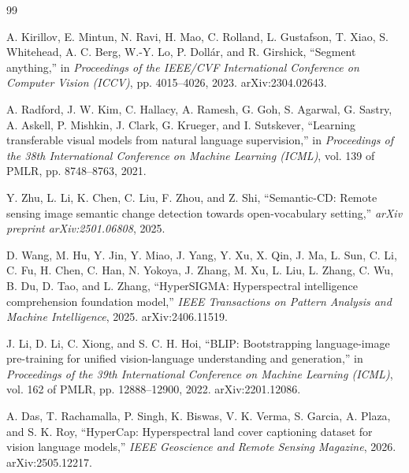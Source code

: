 \documentclass[12pt]{article}
\begin{document}
\begin{thebibliography}{99}

 A. Kirillov, E. Mintun, N. Ravi, H. Mao, C. Rolland, L. Gustafson, T. Xiao, S. Whitehead, A. C. Berg, W.-Y. Lo, P. Dollár, and R. Girshick, ``Segment anything,'' in \textit{Proceedings of the IEEE/CVF International Conference on Computer Vision (ICCV)}, pp. 4015--4026, 2023. arXiv:2304.02643.

 A. Radford, J. W. Kim, C. Hallacy, A. Ramesh, G. Goh, S. Agarwal, G. Sastry, A. Askell, P. Mishkin, J. Clark, G. Krueger, and I. Sutskever, ``Learning transferable visual models from natural language supervision,'' in \textit{Proceedings of the 38th International Conference on Machine Learning (ICML)}, vol. 139 of PMLR, pp. 8748--8763, 2021.

 Y. Zhu, L. Li, K. Chen, C. Liu, F. Zhou, and Z. Shi, ``Semantic-CD: Remote sensing image semantic change detection towards open-vocabulary setting,'' \textit{arXiv preprint arXiv:2501.06808}, 2025.

 D. Wang, M. Hu, Y. Jin, Y. Miao, J. Yang, Y. Xu, X. Qin, J. Ma, L. Sun, C. Li, C. Fu, H. Chen, C. Han, N. Yokoya, J. Zhang, M. Xu, L. Liu, L. Zhang, C. Wu, B. Du, D. Tao, and L. Zhang, ``HyperSIGMA: Hyperspectral intelligence comprehension foundation model,'' \textit{IEEE Transactions on Pattern Analysis and Machine Intelligence}, 2025. arXiv:2406.11519.

 J. Li, D. Li, C. Xiong, and S. C. H. Hoi, ``BLIP: Bootstrapping language-image pre-training for unified vision-language understanding and generation,'' in \textit{Proceedings of the 39th International Conference on Machine Learning (ICML)}, vol. 162 of PMLR, pp. 12888--12900, 2022. arXiv:2201.12086.

 A. Das, T. Rachamalla, P. Singh, K. Biswas, V. K. Verma, S. Garcia, A. Plaza, and S. K. Roy, ``HyperCap: Hyperspectral land cover captioning dataset for vision language models,'' \textit{IEEE Geoscience and Remote Sensing Magazine}, 2026. arXiv:2505.12217.

\end{thebibliography}
\end{document}
